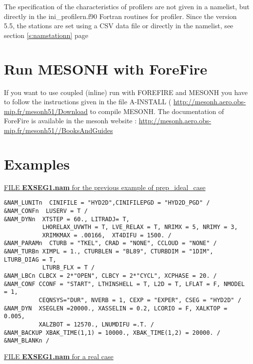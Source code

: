 The specification of the characteristics of profilers are not
 given in a namelist, but directly in the ini\_profilern.f90 Fortran routines for profiler.
Since the version 5.5, the stations are set using a CSV data file or directly in the namelist, see section \ref{s:namstationn} page \pageref{s:namstationn}

\newpage
\section{Run MESONH with ForeFire}
 If you want to use coupled (inline) run with FOREFIRE and MESONH you have to follow the instructions given in  the file A-INSTALL ( \url{http://mesonh.aero.obs-mip.fr/mesonh51/Download} to compile MESONH.
The documentation of ForeFire  is available in the mesonh website : \url{http://mesonh.aero.obs-mip.fr/mesonh51//BooksAndGuides}


\section{Examples }

\underline{FILE {\bf EXSEG1.nam} for the previous example of prep\_ideal\_case}

\begin{verbatim}
&NAM_LUNITn  CINIFILE = "HYD2D",CINIFILEPGD = "HYD2D_PGD" /
&NAM_CONFn  LUSERV = T /
&NAM_DYNn  XTSTEP = 60., LITRADJ= T,
           LHORELAX_UVWTH = T, LVE_RELAX = T, NRIMX = 5, NRIMY = 3, 
           XRIMKMAX = .00166,  XT4DIFU = 1500. /
&NAM_PARAMn  CTURB = "TKEL", CRAD = "NONE", CCLOUD = "NONE" /
&NAM_TURBn XIMPL = 1., CTURBLEN = "BL89", CTURBDIM = "1DIM", LTURB_DIAG = T,
           LTURB_FLX = T /
&NAM_LBCn CLBCX = 2*"OPEN", CLBCY = 2*"CYCL", XCPHASE = 20. /
&NAM_CONF CCONF = "START", LTHINSHELL = T, L2D = T, LFLAT = F, NMODEL = 1, 
          CEQNSYS="DUR", NVERB = 1, CEXP = "EXPER", CSEG = "HYD2D" /
&NAM_DYN  XSEGLEN =20000., XASSELIN = 0.2, LCORIO = F, XALKTOP = 0.005,
          XALZBOT = 12570., LNUMDIFU =.T. /
&NAM_BACKUP XBAK_TIME(1,1) = 10000., XBAK_TIME(1,2) = 20000. /
&NAM_BLANKn /
\end{verbatim}
\newpage
\underline{FILE {\bf EXSEG1.nam} for a real case}

